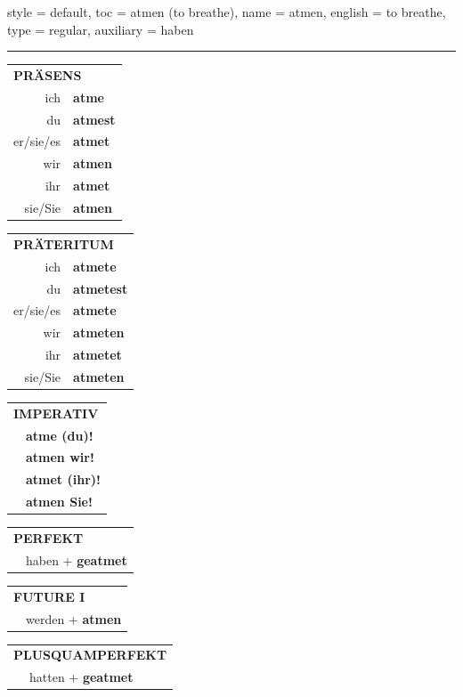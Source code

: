 \begin{verbentry}{
  style = {default},
  toc = {atmen (to breathe)},
  name = {atmen},
  english = {to breathe},
  type = {regular},
  auxiliary = {haben}
}


\vspace{5pt}
\hrule
\vspace{5pt}

\begin{tabular}{rl}
\multicolumn{2}{l}{\textbf{PRÄSENS}}\\
ich & \textbf{atme}\\
du & \textbf{atmest}\\
er/sie/es & \textbf{atmet}\\
wir & \textbf{atmen}\\
ihr & \textbf{atmet}\\
sie/Sie & \textbf{atmen}\\
\end{tabular}
\hfill
\begin{tabular}{rl}
\multicolumn{2}{l}{\textbf{PRÄTERITUM}}\\
ich & \textbf{atmete}\\
du & \textbf{atmetest}\\
er/sie/es & \textbf{atmete}\\
wir & \textbf{atmeten}\\
ihr & \textbf{atmetet}\\
sie/Sie & \textbf{atmeten}\\
\end{tabular}
\hfill
\begin{tabular}{rl}
\multicolumn{2}{l}{\textbf{IMPERATIV}}\\
& \textbf{atme (du)!}\\
& \textbf{atmen wir!}\\
& \textbf{atmet (ihr)!}\\
& \textbf{atmen Sie!}\\
\end{tabular}

\vspace{10pt}

\begin{tabular}{rl}
\multicolumn{2}{l}{\textbf{PERFEKT}}\\
& haben + \textbf{geatmet}\\
\end{tabular}
\hfill
\begin{tabular}{rl}
\multicolumn{2}{l}{\textbf{FUTURE I}}\\
& werden + \textbf{atmen}\\
\end{tabular}
\hfill
\begin{tabular}{rl}
\multicolumn{2}{l}{\textbf{PLUSQUAMPERFEKT}}\\
& hatten + \textbf{geatmet}\\
\end{tabular}


\end{verbentry}
